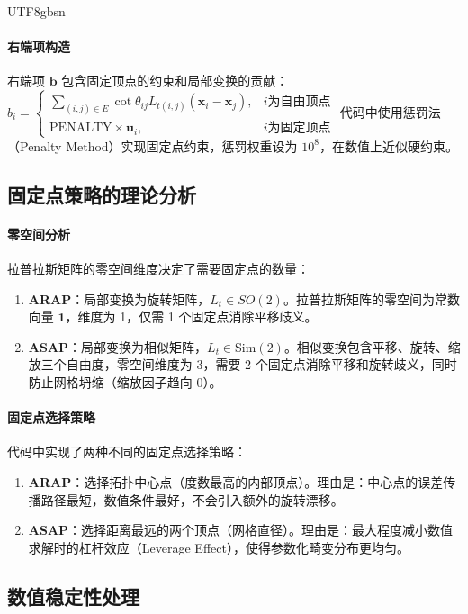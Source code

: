 \documentclass[10pt,a4paper,twocolumn]{article}
\begin{document}
\begin{CJK*}{UTF8}{gbsn}
\paragraph{右端项构造}
右端项 $\mathbf{b}$ 包含固定顶点的约束和局部变换的贡献：
$
b_i = \begin{cases}
\sum_{(i,j)\in E} \cot\theta_{ij} L_{t(i,j)}(\mathbf{x}_i - \mathbf{x}_j), & i \text{为自由顶点} \\
\text{PENALTY} \times \mathbf{u}_i, & i \text{为固定顶点}
\end{cases}
$
代码中使用惩罚法（Penalty Method）实现固定点约束，惩罚权重设为 $10^8$，在数值上近似硬约束。

\subsection{固定点策略的理论分析}

\paragraph{零空间分析}
拉普拉斯矩阵的零空间维度决定了需要固定点的数量：
\begin{enumerate}
\item \textbf{ARAP}：局部变换为旋转矩阵，$L_t \in SO(2)$。拉普拉斯矩阵的零空间为常数向量 $\mathbf{1}$，维度为 1，仅需 1 个固定点消除平移歧义。
\item \textbf{ASAP}：局部变换为相似矩阵，$L_t \in \text{Sim}(2)$。相似变换包含平移、旋转、缩放三个自由度，零空间维度为 3，需要 2 个固定点消除平移和旋转歧义，同时防止网格坍缩（缩放因子趋向 0）。
\end{enumerate}

\paragraph{固定点选择策略}
代码中实现了两种不同的固定点选择策略：
\begin{enumerate}
\item \textbf{ARAP}：选择拓扑中心点（度数最高的内部顶点）。理由是：中心点的误差传播路径最短，数值条件最好，不会引入额外的旋转漂移。
\item \textbf{ASAP}：选择距离最远的两个顶点（网格直径）。理由是：最大程度减小数值求解时的杠杆效应（Leverage Effect），使得参数化畸变分布更均匀。
\end{enumerate}

\subsection{数值稳定性处理}


\end{CJK*}
\end{document}
